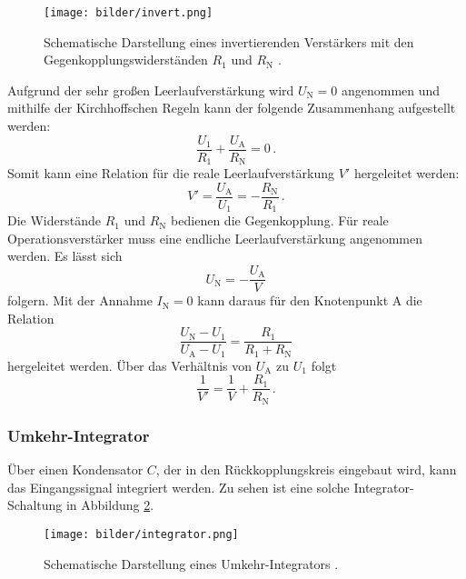   \begin{figure}[H]
    \centering
    \texttt{[image: bilder/invert.png]}
    \caption{Schematische Darstellung eines invertierenden Verstärkers mit den Gegenkopplungswiderständen $R_1$ und $R_\text{N}$ \cite{anleitung}.}
    \label{invert}
  \end{figure}

Aufgrund der sehr großen Leerlaufverstärkung wird $U_\text{N}=0$ angenommen und mithilfe der Kirchhoffschen Regeln kann der folgende Zusammenhang aufgestellt werden:
\begin{equation}
  \frac{U_1}{R_1}+\frac{U_\text{A}}{R_\text{N}}=0\,.
\end{equation}
  Somit kann eine Relation für die reale Leerlaufverstärkung $V'$ hergeleitet werden:
  \begin{equation}
    V'=\frac{U_\text{A}}{U_\text{1}}=-\frac{R_\text{N}}{R_1}\,.
    \label{eq:V_linear}
  \end{equation}
  Die Widerstände $R_1$ und $R_\text{N}$ bedienen die Gegenkopplung. Für reale Operationsverstärker muss eine endliche Leerlaufverstärkung angenommen werden. Es lässt sich
  \begin{equation}
    U_\text{N}=-\frac{U_\text{A}}{V}
  \end{equation}
  folgern.
  Mit der Annahme $I_\text{N}=0$ kann daraus für den Knotenpunkt A die Relation
  \begin{equation}
    \frac{U_\text{N}-U_1}{U_\text{A}-U_1}=\frac{R_1}{R_1+R_\text{N}}
  \end{equation}
  hergeleitet werden. Über das Verhältnis von $U_\text{A}$ zu $U_1$ folgt
  \begin{equation}
    \frac{1}{V'}=\frac{1}{V}+\frac{R_1}{R_\text{N}}\,.
  \end{equation}
\subsubsection{Umkehr-Integrator}
Über einen Kondensator $C$, der in den Rückkopplungskreis eingebaut wird, kann das Eingangssignal integriert werden. Zu sehen ist eine solche Integrator-Schaltung in Abbildung \ref{integrator}.

\begin{figure}[H]
  \centering
  \texttt{[image: bilder/integrator.png]}
  \caption{Schematische Darstellung eines Umkehr-Integrators \cite{anleitung}.}
  \label{integrator}
\end{figure}

